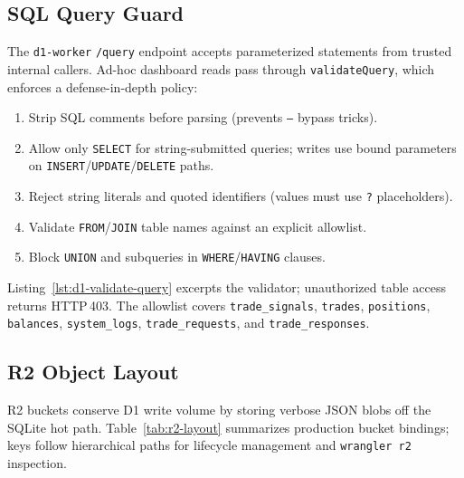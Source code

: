 
\subsection{SQL Query Guard}

The \texttt{d1-worker} \texttt{/query} endpoint accepts parameterized statements from trusted internal callers. Ad-hoc dashboard reads pass through \texttt{validateQuery}, which enforces a defense-in-depth policy:

\begin{enumerate}
  \item Strip SQL comments before parsing (prevents \texttt{--} bypass tricks).
  \item Allow only \texttt{SELECT} for string-submitted queries; writes use bound parameters on \texttt{INSERT}/\texttt{UPDATE}/\texttt{DELETE} paths.
  \item Reject string literals and quoted identifiers (values must use \texttt{?} placeholders).
  \item Validate \texttt{FROM}/\texttt{JOIN} table names against an explicit allowlist.
  \item Block \texttt{UNION} and subqueries in \texttt{WHERE}/\texttt{HAVING} clauses.
\end{enumerate}

Listing~\ref{lst:d1-validate-query} excerpts the validator; unauthorized table access returns HTTP\,403. The allowlist covers \texttt{trade\_signals}, \texttt{trades}, \texttt{positions}, \texttt{balances}, \texttt{system\_logs}, \texttt{trade\_requests}, and \texttt{trade\_responses}.


\subsection{R2 Object Layout}

R2 buckets conserve D1 write volume by storing verbose JSON blobs off the SQLite hot path. Table~\ref{tab:r2-layout} summarizes production bucket bindings; keys follow hierarchical paths for lifecycle management and \texttt{wrangler r2} inspection.

